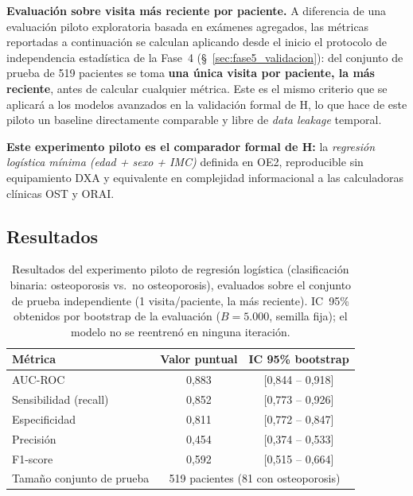 \documentclass[../tesis.tex]{subfiles}
\begin{document}
\textbf{Evaluación sobre visita más reciente por paciente.} A diferencia de una evaluación piloto exploratoria basada en exámenes agregados, las métricas reportadas a continuación se calculan aplicando desde el inicio el protocolo de independencia estadística de la Fase~4 (§~\ref{sec:fase5_validacion}): del conjunto de prueba de 519 pacientes se toma \textbf{una única visita por paciente, la más reciente}, antes de calcular cualquier métrica. Este es el mismo criterio que se aplicará a los modelos avanzados en la validación formal de H, lo que hace de este piloto un baseline directamente comparable y libre de \textit{data leakage} temporal.

\textbf{Este experimento piloto es el comparador formal de H:} la \textit{regresión logística mínima (edad + sexo + IMC)} definida en OE2, reproducible sin equipamiento DXA y equivalente en complejidad informacional a las calculadoras clínicas OST y ORAI.

\subsection{Resultados}

\begin{table}[h]
\centering
\caption[Resultados del experimento piloto de regresión logística]{Resultados del experimento piloto de regresión logística (clasificación binaria: osteoporosis vs.\ no osteoporosis), evaluados sobre el conjunto de prueba independiente (1 visita/paciente, la más reciente). IC~95\% obtenidos por bootstrap de la evaluación ($B = 5.000$, semilla fija); el modelo no se reentrenó en ninguna iteración.}
\label{tab:piloto}
\begin{tabular}{lcc}
\toprule
\textbf{Métrica}          & \textbf{Valor puntual} & \textbf{IC 95\% bootstrap} \\
\midrule
AUC-ROC                   & 0{,}883 & [0{,}844 -- 0{,}918] \\
Sensibilidad (recall)     & 0{,}852 & [0{,}773 -- 0{,}926] \\
Especificidad             & 0{,}811 & [0{,}772 -- 0{,}847] \\
Precisión                 & 0{,}454 & [0{,}374 -- 0{,}533] \\
F1-score                  & 0{,}592 & [0{,}515 -- 0{,}664] \\
Tamaño conjunto de prueba & \multicolumn{2}{c}{519 pacientes (81 con osteoporosis)} \\
\bottomrule
\end{tabular}
\end{table}
\end{document}

